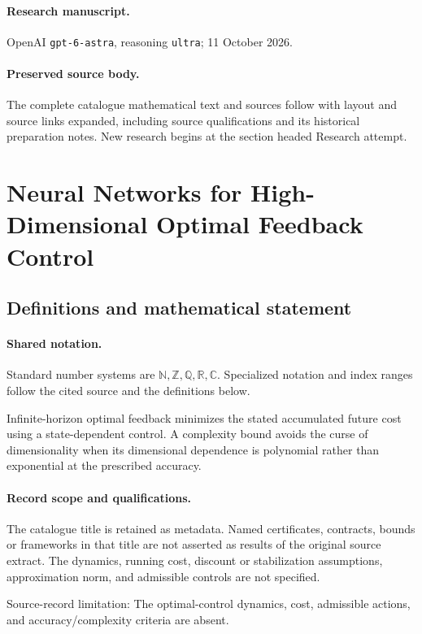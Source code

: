 \documentclass[11pt]{article}
\begin{document}
\paragraph{Research manuscript.} OpenAI \texttt{gpt-6-astra}, reasoning \texttt{ultra}; 11 October 2026.
\paragraph{Preserved source body.} The complete catalogue mathematical text and sources follow with layout and source links expanded, including source qualifications and its historical preparation notes. New research begins at the section headed Research attempt.

\section{Neural Networks for High-Dimensional Optimal Feedback Control}\label{statement}

\subsection{Definitions and mathematical statement}

\paragraph{Shared notation.}Standard number systems are $\mathbb N,\mathbb Z,\mathbb Q,\mathbb R,\mathbb C$. Specialized notation and index ranges follow the cited source and the definitions below.


Infinite-horizon optimal feedback minimizes the stated accumulated future cost using a state-dependent control. A complexity bound avoids the curse of dimensionality when its dimensional dependence is polynomial rather than exponential at the prescribed accuracy.
\paragraph{Record scope and qualifications.}
The catalogue title is retained as metadata. Named certificates, contracts, bounds or frameworks in that title are not asserted as results of the original source extract.
The dynamics, running cost, discount or stabilization assumptions, approximation norm, and admissible controls are not specified.

Source-record limitation: The optimal-control dynamics, cost, admissible actions, and accuracy/complexity criteria are absent.
\end{document}
